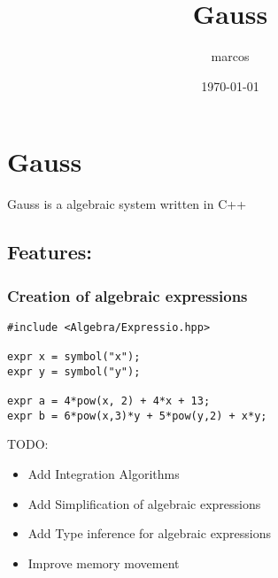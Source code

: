 \documentclass[11pt]{article}
\author{marcos}
\date{\today}
\title{Gauss}
\begin{document}
\maketitle
\tableofcontents



\section{Gauss}
\label{sec:org68e6c8b}
Gauss is a algebraic system written in C++

\subsection{Features:}
\label{sec:org970fc94}
\subsubsection{Creation of algebraic expressions}
\label{sec:org886083a}
\begin{verbatim}
#include <Algebra/Expressio.hpp>

expr x = symbol("x");
expr y = symbol("y");

expr a = 4*pow(x, 2) + 4*x + 13;
expr b = 6*pow(x,3)*y + 5*pow(y,2) + x*y;
\end{verbatim}

TODO:
\begin{itemize}
\item Add Integration Algorithms
\item Add Simplification of algebraic expressions
\item Add Type inference for algebraic expressions
\item Improve memory movement
\end{itemize}
\end{document}
